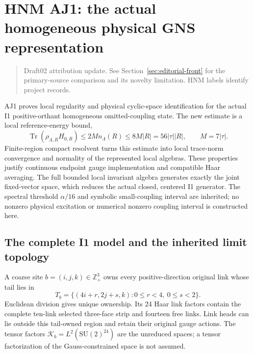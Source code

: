 \section{HNM AJ1: the actual homogeneous physical GNS representation\workstar}
\begin{quote}\small Draft02 attribution update. See Section~\ref{sec:editorial-front} for the primary-source comparison and its novelty limitation. HNM labels identify project records.\end{quote}
\label{r28:sec:aj1}
AJ1 proves local regularity and physical cyclic-space identification for the actual I1 positive-orthant homogeneous omitted-coupling state. The new estimate is a local reference-energy bound,
\begin{equation}
 \operatorname{Tr}(\rho_{\Lambda,R}H_{0,R})
 \le2M n_\Lambda(R)\le8M|R|=56|\tau||R|,
 \qquad M=7|\tau|.
 \label{r28:eq:aj1-energy}
\end{equation}
Finite-region compact resolvent turns this estimate into local trace-norm convergence and normality of the represented local algebras. These properties justify continuous endpoint gauge implementation and compatible Haar averaging. The full bounded local invariant algebra generates exactly the joint fixed-vector space, which reduces the actual closed, centered I1 generator. The spectral threshold $\alpha/16$ and symbolic small-coupling interval are inherited; no nonzero physical excitation or numerical nonzero coupling interval is constructed here.

\subsection{The complete I1 model and the inherited limit topology}
A coarse site $b=(i,j,k)\in\mathbb Z_+^3$ owns every positive-direction original link whose tail lies in
\begin{equation}
 T_b=\{(4i+r,2j+s,k):0\le r<4,\ 0\le s<2\}.
\end{equation}
Euclidean division gives unique ownership. Its 24 Haar link factors contain the complete ten-link selected three-face strip and fourteen free links. Link heads can lie outside this tail-owned region and retain their original gauge actions. The tensor factors $\mathcal K_b=L^2(\mathrm{SU}(2)^{24})$ are the unreduced spaces; a tensor factorization of the Gauss-constrained space is not assumed.

